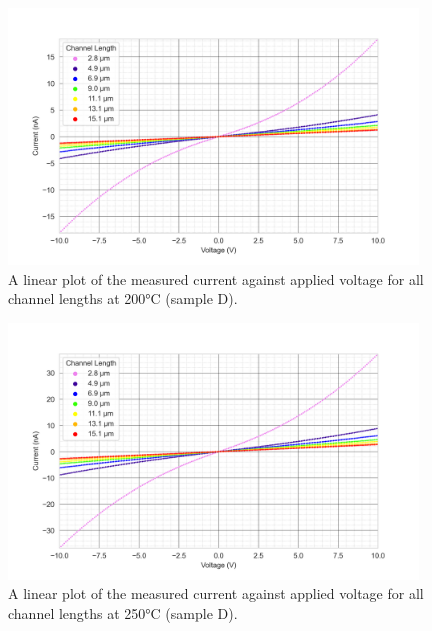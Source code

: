 \begin{figure}[h]
    \centering
    \includegraphics[width=0.97\textwidth]{Chapter3/Figs/Raster/Sample D 2019/IV/10V IV characteristics at 200 C.png}
    \caption{A linear plot of the measured current against applied voltage for all channel lengths at 200\si{\degreeCelsius} (sample D).}
    \label{appfig:D_current_voltage_200_10V}
\end{figure}
\begin{figure}[h]
    \centering
    \includegraphics[width=0.97\textwidth]{Chapter3/Figs/Raster/Sample D 2019/IV/10V IV characteristics at 250 C.png}
    \caption{A linear plot of the measured current against applied voltage for all channel lengths at 250\si{\degreeCelsius} (sample D).}
    \label{appfig:D_current_voltage_250_10V}
\end{figure}
